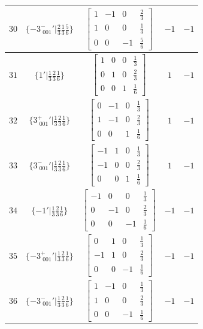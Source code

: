 \documentclass[fleqn,8pt]{jsarticle}
\begin{document}
\begin{longtable}{ccccc}
$ 30 $ & $ \{-3^{-}_{\,\,001}{}'|\frac{2}{3} \frac{1}{3} \frac{5}{6}\} $ & $ \begin{bmatrix} 1 & -1 & 0 & \frac{2}{3} \\ 1 & 0 & 0 & \frac{1}{3} \\ 0 & 0 & -1 & \frac{5}{6} \end{bmatrix} $ & $ -1 $ & $ -1 $ \\ \hline
$ 31 $ & $ \{1{}'|\frac{1}{3} \frac{2}{3} \frac{1}{6}\} $ & $ \begin{bmatrix} 1 & 0 & 0 & \frac{1}{3} \\ 0 & 1 & 0 & \frac{2}{3} \\ 0 & 0 & 1 & \frac{1}{6} \end{bmatrix} $ & $ 1 $ & $ -1 $ \\ \hline
$ 32 $ & $ \{3^{+}_{\,\,001}{}'|\frac{1}{3} \frac{2}{3} \frac{1}{6}\} $ & $ \begin{bmatrix} 0 & -1 & 0 & \frac{1}{3} \\ 1 & -1 & 0 & \frac{2}{3} \\ 0 & 0 & 1 & \frac{1}{6} \end{bmatrix} $ & $ 1 $ & $ -1 $ \\ \hline
$ 33 $ & $ \{3^{-}_{\,\,001}{}'|\frac{1}{3} \frac{2}{3} \frac{1}{6}\} $ & $ \begin{bmatrix} -1 & 1 & 0 & \frac{1}{3} \\ -1 & 0 & 0 & \frac{2}{3} \\ 0 & 0 & 1 & \frac{1}{6} \end{bmatrix} $ & $ 1 $ & $ -1 $ \\ \hline
$ 34 $ & $ \{-1{}'|\frac{1}{3} \frac{2}{3} \frac{1}{6}\} $ & $ \begin{bmatrix} -1 & 0 & 0 & \frac{1}{3} \\ 0 & -1 & 0 & \frac{2}{3} \\ 0 & 0 & -1 & \frac{1}{6} \end{bmatrix} $ & $ -1 $ & $ -1 $ \\ \hline
$ 35 $ & $ \{-3^{+}_{\,\,001}{}'|\frac{1}{3} \frac{2}{3} \frac{1}{6}\} $ & $ \begin{bmatrix} 0 & 1 & 0 & \frac{1}{3} \\ -1 & 1 & 0 & \frac{2}{3} \\ 0 & 0 & -1 & \frac{1}{6} \end{bmatrix} $ & $ -1 $ & $ -1 $ \\ \hline
$ 36 $ & $ \{-3^{-}_{\,\,001}{}'|\frac{1}{3} \frac{2}{3} \frac{1}{6}\} $ & $ \begin{bmatrix} 1 & -1 & 0 & \frac{1}{3} \\ 1 & 0 & 0 & \frac{2}{3} \\ 0 & 0 & -1 & \frac{1}{6} \end{bmatrix} $ & $ -1 $ & $ -1 $ \\
\end{longtable}
\end{document}
